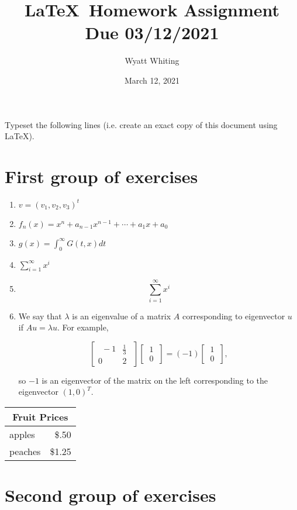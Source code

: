 \documentclass[10pt, reqno]{article}
\title{\LaTeX \ Homework Assignment \\
Due 03/12/2021}
\author{Wyatt Whiting}
\date{March 12, 2021}
\begin{document}
\maketitle

Typeset the following lines (i.e. create an exact copy of this document using \LaTeX).

\section{First group of exercises}

\begin{enumerate}
\item $v = (v_1,v_2,v_3)^t$
\item $f_n(x) = x^n + a_{n - 1}x^{n - 1} + \cdots + a_1x + a_0$
\item $g(x)=\int_0^{\infty}G(t,x)dt$
\item $\sum_{i=1}^{\infty}x^i$
\item \[\sum_{i=1}^{\infty}x^i \]
\item We say that $\lambda$ is an eigenvalue of a matrix $A$ corresponding to eigenvector $u$ if $Au=\lambda u$. For example,

\[ 
\begin{bmatrix}
\ \  -1 & \frac{1}{3}\ \ \\
0 & 2 \ \ 
\end{bmatrix} 
\begin{bmatrix}
\ 1\ \\
\ 0\  
\end{bmatrix}
=
(-1)
\begin{bmatrix}
\ 1\  \\ 
\ 0\ 
\end{bmatrix}, 
\]


so $-1$ is an eigenvector of the matrix on the left corresponding to the eigenvector $(1, 0)^T$.

\end{enumerate}

\begin{center}
	\begin{tabular}{||l|r|}
	\hline
	\multicolumn{2}{||c|}{Fruit Prices} \tabularnewline
	\hline
	apples & \$.50 \tabularnewline
	peaches & \$1.25 \tabularnewline
	\hline
	\end{tabular}
\end{center}

\newpage

\section{Second group of exercises}
\end{document}
